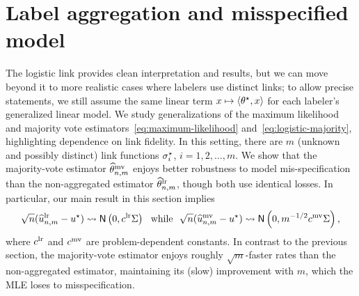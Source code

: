 \section{Label aggregation and misspecified model}
\label{sec:mis-spec}

The logistic link provides clean interpretation and results, but we can
move beyond it to more realistic cases where labelers use
distinct links; to allow precise statements, we still assume the
same linear term $x \mapsto \langle\theta^\star, x\rangle$ for each labeler's
generalized linear model. We study generalizations of the maximum
likelihood and majority vote estimators~\eqref{eq:maximum-likelihood}
and~\eqref{eq:logistic-majority}, highlighting dependence on
link fidelity.
In this setting, there are $m$ (unknown and possibly distinct)
link functions $\sigma_i^\star$, $i=1,2, \ldots, m$.
We show that the majority-vote estimator $\widehat{\theta}^{\textup{mv}}_{n,m}$ enjoys better robustness to model mis-specification than the non-aggregated estimator $\widehat{\theta}^{\textup{lr}}_{n,m}$,
though both use identical losses.
In particular, our main result in this section implies
\begin{equation*}
	\sqrt{n}(\widehat{u}^{\textup{lr}}_{n,m} - u^\star) \rightsquigarrow
	\mathsf{N}\left(0, c^{\textup{lr}} \Sigma \right)
	~~ \mbox{while} ~~
	\sqrt{n}(\widehat{u}^{\textup{mv}}_{n,m} - u^\star) \rightsquigarrow
	\mathsf{N}\left(0, m^{-1/2} c^{\textup{mv}} \Sigma \right),
\end{equation*}
where $c^{\textup{lr}}$ and $c^{\textup{mv}}$ are problem-dependent constants. %
In contrast to the previous section, the majority-vote
estimator enjoys roughly $\sqrt{m}$-faster rates than the non-aggregated
estimator, maintaining its (slow) improvement with $m$, which the
MLE loses to misspecification.

